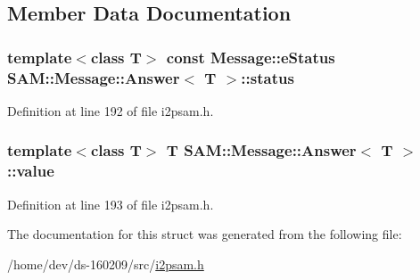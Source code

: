 \subsection{Member Data Documentation}
\hypertarget{struct_s_a_m_1_1_message_1_1_answer_a5d79819d3f9780108d1c14c376b5433b}{}
\subsubsection[{status}]{\setlength{\rightskip}{0pt plus 5cm}template$<$class T$>$ const {\bf Message\+::e\+Status} {\bf S\+A\+M\+::\+Message\+::\+Answer}$<$ T $>$\+::status}\label{struct_s_a_m_1_1_message_1_1_answer_a5d79819d3f9780108d1c14c376b5433b}


Definition at line 192 of file i2psam.\+h.

\hypertarget{struct_s_a_m_1_1_message_1_1_answer_a1353bce316f2d809131541f2ca980b64}{}
\subsubsection[{value}]{\setlength{\rightskip}{0pt plus 5cm}template$<$class T$>$ T {\bf S\+A\+M\+::\+Message\+::\+Answer}$<$ T $>$\+::value}\label{struct_s_a_m_1_1_message_1_1_answer_a1353bce316f2d809131541f2ca980b64}


Definition at line 193 of file i2psam.\+h.



The documentation for this struct was generated from the following file\+:\begin{DoxyCompactItemize}
\item 
/home/dev/ds-\/160209/src/\hyperlink{i2psam_8h}{i2psam.\+h}\end{DoxyCompactItemize}
